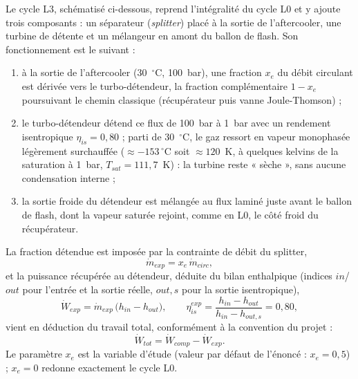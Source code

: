 Le cycle L3, schématisé ci-dessous, reprend l'intégralité du cycle L0 et
y ajoute trois composants : un séparateur (\emph{splitter}) placé à la sortie
de l'aftercooler, une turbine de détente et un mélangeur en
amont du ballon de flash. Son fonctionnement est le suivant :
\begin{enumerate}
  \item à la sortie de l'aftercooler (30~$^\circ$C, 100~bar), une fraction
        $x_e$ du débit circulant est dérivée vers le turbo-détendeur, la
        fraction complémentaire $1 - x_e$ poursuivant le chemin classique
        (récupérateur puis vanne Joule-Thomson) ;
  \item le turbo-détendeur détend ce flux de 100~bar à 1~bar avec un
        rendement isentropique $\eta_{is} = 0{,}80$ ; parti de 30~$^\circ$C,
        le gaz ressort en vapeur monophasée légèrement surchauffée
        ($\approx -153\,^\circ$C soit $\approx 120$~K, à quelques kelvins de
        la saturation à 1~bar, $T_{sat} = 111{,}7$~K) : la turbine reste
        « sèche », sans aucune condensation interne ;
  \item la sortie froide du détendeur est mélangée au flux laminé juste
        avant le ballon de flash, dont la vapeur saturée rejoint, comme en
        L0, le côté froid du récupérateur.
\end{enumerate}
La fraction détendue est imposée par la contrainte de débit du splitter,
\begin{equation}
  \dot m_{exp} = x_e \, \dot m_{circ},
  \label{eq:split}
\end{equation}
et la puissance récupérée au détendeur, déduite du bilan enthalpique (indices
$in$/$out$ pour l'entrée et la sortie réelle, $out,s$ pour la sortie
isentropique),
\begin{equation}
  \dot W_{exp} = \dot m_{exp}\,\bigl(h_{in} - h_{out}\bigr),
  \qquad
  \eta_{is}^{exp} = \frac{h_{in} - h_{out}}{h_{in} - h_{out,s}} = 0{,}80 ,
  \label{eq:expander}
\end{equation}
vient en déduction du travail total, conformément à la convention du projet :
\begin{equation}
  \dot W_{tot} = \dot W_{comp} - \dot W_{exp} .
  \label{eq:w_L3}
\end{equation}
Le paramètre $x_e$ est la variable d'étude (valeur par défaut de l'énoncé :
$x_e = 0{,}5$) ; $x_e = 0$ redonne exactement le cycle L0.


